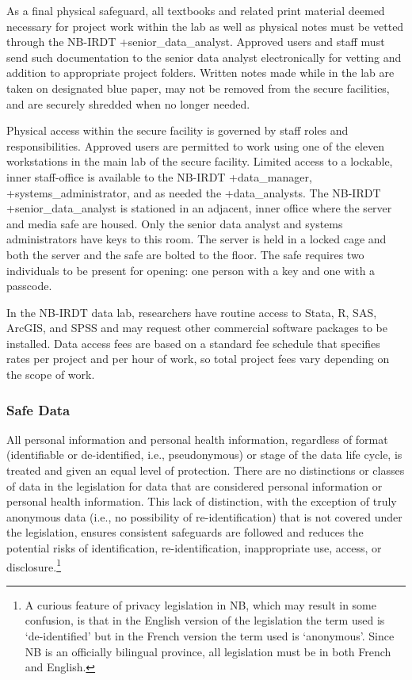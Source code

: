 \documentclass[
]{WileySix}
\begin{document}
As a final physical safeguard, all textbooks and related print material deemed necessary for project work within the lab as well as physical notes must be vetted through the NB-IRDT +senior\_data\_analyst\textbar. Approved users and staff must send such documentation to the senior data analyst electronically for vetting and addition to appropriate project folders. Written notes made while in the lab are taken on designated blue paper, may not be removed from the secure facilities, and are securely shredded when no longer needed.

Physical access within the secure facility is governed by staff roles and responsibilities. Approved users are permitted to work using one of the eleven workstations in the main lab of the secure facility. Limited access to a lockable, inner staff-office is available to the NB-IRDT +data\_manager\textbar, +systems\_administrator\textbar, and as needed the +data\_analysts\textbar. The NB-IRDT +senior\_data\_analyst\textbar{} is stationed in an adjacent, inner office where the server and media safe are housed. Only the senior data analyst and systems administrators have keys to this room. The server is held in a locked cage and both the server and the safe are bolted to the floor. The safe requires two individuals to be present for opening: one person with a key and one with a passcode. ~~

In the NB-IRDT data lab, researchers have routine access to Stata, R, SAS, ArcGIS, and SPSS and may request other commercial software packages to be installed. Data access fees are based on a standard fee schedule that specifies rates per project and per hour of work, so total project fees vary depending on the scope of work.

\hypertarget{safe-data-2}{%
\subsubsection{Safe Data}\label{safe-data-2}}

All personal information and personal health information, regardless of format (identifiable or de-identified, i.e., pseudonymous) or stage of the data life cycle, is treated and given an equal level of protection. There are no distinctions or classes of data in the legislation for data that are considered personal information or personal health information. This lack of distinction, with the exception of truly anonymous data (i.e., no possibility of re-identification) that is not covered under the legislation, ensures consistent safeguards are followed and reduces the potential risks of identification, re-identification, inappropriate use, access, or disclosure.\footnote{A curious feature of privacy legislation in NB, which may result in some confusion, is that in the English version of the legislation the term used is `de-identified' but in the French version the term used is `anonymous'. Since NB is an officially bilingual province, all legislation must be in both French and English.}
\end{document}
